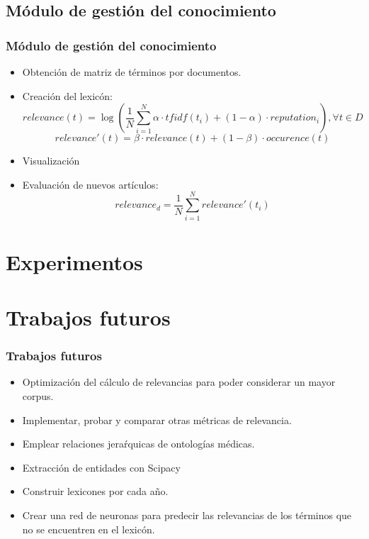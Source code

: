\documentclass[10pt,fleqn]{beamer}
\begin{document}
\subsection{Módulo de gestión del conocimiento}
\begin{frame} \frametitle{Módulo de gestión del conocimiento} 
\begin{itemize}
\item Obtención de matriz de términos por documentos.
\item Creación del lexicón:
\begin{equation}
	relevance(t) =\log(\frac{1}{N} \sum  \limits_{i=1}^N \alpha \cdot tfidf(t_i) + (1-\alpha)\cdot reputation_i),    \forall t \in D
    \label{eq:relevance}
\end{equation}
\begin{equation}
	relevance'(t) = \beta \cdot relevance(t) + (1 - \beta) \cdot occurence(t)
    \label{eq:relevance2}
\end{equation}

\item Visualización
\item Evaluación de nuevos artículos:
\begin{equation}
	relevance_d =  \frac{1}{N} \sum  \limits_{i=1}^N relevance'(t_i)
    \label{eq:relevance3}
\end{equation}

\end{itemize}



\end{frame}


\section{Experimentos}
\subsection{}

\section{Trabajos futuros}
\begin{frame} \frametitle{Trabajos futuros} 
\begin{itemize}
\item Optimización del cálculo de relevancias para poder considerar un mayor corpus.
\item Implementar, probar y comparar otras métricas de relevancia.
\item Emplear relaciones jeraŕquicas de ontologías médicas.
\item Extracción de entidades con Scipacy
\item Construir lexicones por cada año.
\item Crear una red de neuronas para predecir las relevancias de los términos que no se encuentren en el lexicón.
\end{itemize}
\end{frame}
\end{document}
